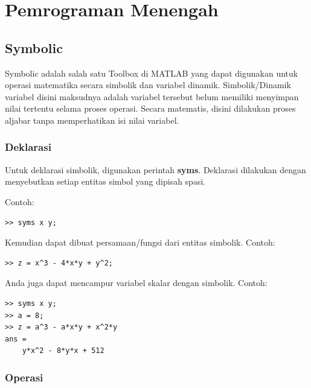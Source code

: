 \documentclass[12pt]{book}
\begin{document}
	\newpage
	\chapter{Pemrograman Menengah}

	\section{Symbolic}
	
	Symbolic adalah salah satu Toolbox di MATLAB yang dapat digunakan untuk operasi matematika secara simbolik dan variabel dinamik.
	Simbolik/Dinamik variabel disini maksudnya adalah variabel tersebut belum memiliki menyimpan nilai tertentu selama proses operasi.
	Secara matematis, disini dilakukan proses aljabar tanpa memperhatikan isi nilai variabel.
	
	\subsection{Deklarasi}
	
	Untuk deklarasi simbolik, digunakan perintah \textbf{syms}.
	Deklarasi dilakukan dengan menyebutkan setiap entitas simbol yang dipisah spasi.
	
	Contoh:
	\begin{verbatim}
>> syms x y;
	\end{verbatim}
	
	Kemudian dapat dibuat persamaan/fungsi dari entitas simbolik.
	Contoh:
 	\begin{verbatim}
>> z = x^3 - 4*x*y + y^2;
 	\end{verbatim}
 
 	Anda juga dapat mencampur variabel skalar dengan simbolik.
 	Contoh:
 	\begin{verbatim}
>> syms x y;
>> a = 8;
>> z = a^3 - a*x*y + x^2*y
ans =
    y*x^2 - 8*y*x + 512
 	\end{verbatim}
	
	\subsection{Operasi}
	
\end{document}
